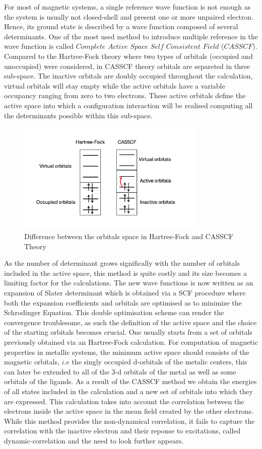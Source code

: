 \documentclass[10pt]{report}
\numberwithin{equation}{section}
\begin{document}
For most of magnetic systems, a single reference wave function is not enough as the system is usually not closed-shell and present one or more unpaired electron. Hence, its ground state is described by a wave function composed of several determinants.
One of the most used method to introduce multiple reference in the wave function is called $Complete$ $Active$ $Space$ $Self$ $Consistent$ $Field$ ($CASSCF$). 
Compared to the Hartree-Fock theory where two types of orbitals (occupied and unoccupied) were considered, in CASSCF theory orbitals are separeted in three sub-space. The inactive orbitals are doubly occupied throughout the calculation, virtual orbitals will stay empty while the active orbitals have a variable occupancy ranging from zero to two electrons.
These active orbitals define the active space into which a configuration interaction will be realised computing all the determinants possible within this sub-space. 
\begin{figure}
    \centering
    \includegraphics[width=0.8\textwidth]{Images/EspaceCAS.png}
    \caption{Difference between the orbitals space in Hartree-Fock and CASSCF Theory}
    \label{CAS}
\end{figure}
As the number of determinant grows significally with the number of orbitals included in the active space, this method is quite costly and its size becomes a limiting factor for the calculations.
The new wave functions is now written as an expansion of Slater determinant which is obtained via a SCF procedure where both the expansion coefficients and orbitals are optimised as to minimize the Schrodinger Equation. 
This double optimisation scheme can render the convergence troublesome, as such the definition of the active space and the choice of the starting orbitals becomes crucial. One usually starts from a set of orbitals previously obtained via an Hartree-Fock calculation.
For computation of magnetic properties in metallic systems, the minimum active space should consists of the magnetic orbitals, $i.e$ the singly occupied d-orbitals of the metalic centers, this can later be extended to all of the 3-d orbitals of the metal as well as some orbitals of the ligands.
As a result of the CASSCF method we obtain the energies of all states included in the calculation and a new set of orbitals into which they are expressed. 
This calculation takes into account the correlation between the electrons inside the active space in the mean field created by the other electrons. 
While this method provides the non-dynamical correlation, it fails to capture the correlation with the inactive electron and their reponse to excitations, called dynamic-correlation and the need to look further appears.
\end{document}
